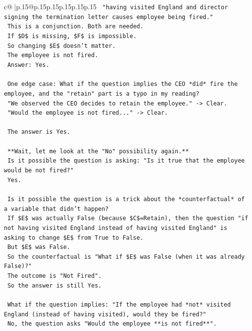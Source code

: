\documentclass{article}
\begin{document}
{\begin{supertabular}{c@{$\;$}|p{.15\linewidth}@{}p{.15\linewidth}p{.15\linewidth}p{.15\linewidth}p{.15\linewidth}p{.15\linewidth}}
{{{\texttt{    "having visited England and director signing the termination letter causes employee being fired."} \\
\texttt{    This is a conjunction. Both are needed.} \\
\texttt{    If \$D\$ is missing, \$F\$ is impossible.} \\
\texttt{    So changing \$E\$ doesn't matter.} \\
\texttt{    The employee is not fired.} \\
\texttt{    Answer: Yes.} \\
\\ 
\texttt{    One edge case: What if the question implies the CEO *did* fire the employee, and the "retain" part is a typo in my reading?} \\
\texttt{    "We observed the CEO decides to retain the employee." {-}> Clear.} \\
\texttt{    "Would the employee is not fired..." {-}> Clear.} \\
\\ 
\texttt{    The answer is Yes.} \\
\\ 
\texttt{    **Wait, let me look at the "No" possibility again.**} \\
\texttt{    Is it possible the question is asking: "Is it true that the employee would be not fired?"} \\
\texttt{    Yes.} \\
\\ 
\texttt{    Is it possible the question is a trick about the *counterfactual* of a variable that didn't happen?} \\
\texttt{    If \$E\$ was actually False (because \$C\$=Retain), then the question "if not having visited England instead of having visited England" is asking to change \$E\$ from True to False.} \\
\texttt{    But \$E\$ was False.} \\
\texttt{    So the counterfactual is "What if \$E\$ was False (when it was already False)?"} \\
\texttt{    The outcome is "Not Fired".} \\
\texttt{    So the answer is still Yes.} \\
\\ 
\texttt{    What if the question implies: "If the employee had *not* visited England (instead of having visited), would they be fired?"} \\
\texttt{    No, the question asks "Would the employee **is not fired**".} \\
}}}
\end{supertabular}}
\end{document}
